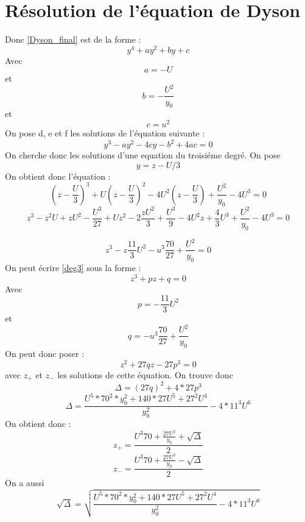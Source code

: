 \documentclass[12pt]{article}
\begin{document}
\section{R\'esolution de l'\'equation de Dyson}
Donc \ref{Dyson_final} est de la forme :
\begin{equation}
y^4 + a y^2 + b y + c 
\end{equation}
Avec $$a = -U$$ et $$b = -\frac{U^2}{y_0}$$ et $$c = u^2$$
On pose d, e et f les solutions de l'\'equation suivante : 
\begin{equation}
y^3 - a y^2 -4cy - b^2 + 4 ac = 0
\end{equation}
On cherche donc les solutions d'une equation du troisi\'eme degr\'e.
On pose $$y = z - U/3$$
On obtient donc l'\'equation :
\begin{equation}
(z - \frac{U}{3})^3  + U (z - \frac{U}{3})^2 - 4 U ^2(z - \frac{U}{3}) + \frac{U^2}{y_0} - 4U^3 = 0
\end{equation}
\begin{equation}
z^3-z^2U+zU^2 - \frac{U^3}{27}+Uz^2-2\frac{zU^2}{3}+ \frac{U^3}{9} - 4U^2z+\frac{4}{3}U^3+\frac{U^2}{y_0}-4U^3 = 0
\end{equation}

\begin{equation}
\label{deg3}
z^3 - z\frac{11}{3}U^2 - u^3\frac{70}{27}+\frac{U^2}{y_0} = 0 
\end{equation}
On peut \'ecrire \ref{deg3} sous la forme :
\begin{equation}
z^3+pz+q = 0
\end{equation}
Avec $$p = -\frac{11}{3}U^2$$ et $$q = - u^3\frac{70}{27}+\frac{U^2}{y_0} $$
On peut donc poser :
\begin{equation}
z^2+27qz - 27p^3 = 0 
\end{equation}
avec $z_{+}$ et $z_{-}$ les solutions de cette \'equation.
On trouve donc $$\Delta = (27q)^2 + 4*27p^3$$
\begin{equation}
\Delta = \frac{U^5*70^2*y_0^2+ 140*27U^5+27^2U^4}{y_0^2} - 4*11^3U^6 
\end{equation}
On obtient donc :
\begin{equation}
z_+ = \frac{U^3 70 + \frac{27U^2}{y_0} +\sqrt{\Delta}}{2} 
\end{equation}
\begin{equation}
z_- = \frac{U^3 70 + \frac{27U^2}{y_0} -\sqrt{\Delta}}{2}  
\end{equation}
On a aussi
\begin{equation}
 \sqrt{\Delta} = \sqrt{\frac{U^5*70^2*y_0^2+ 140*27U^5+27^2U^4}{y_0^2} - 4*11^3U^6 }
\end{equation}
\end{document}
